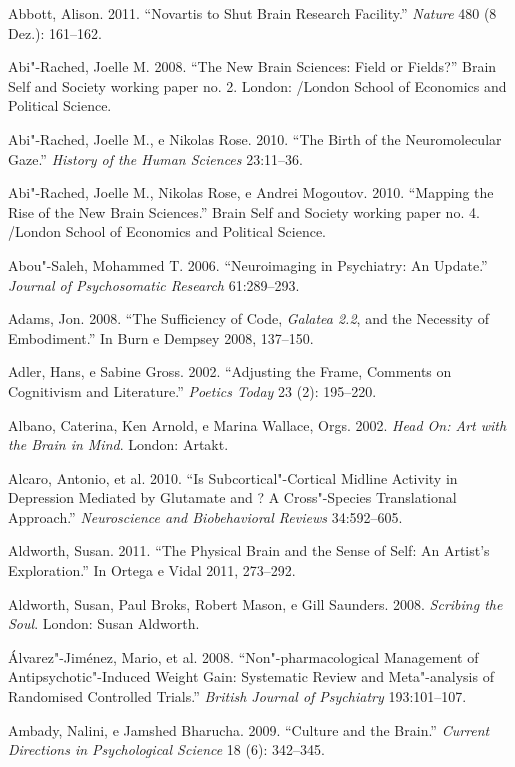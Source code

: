 \footnotesize{\begin{Parskip}
Abbott, Alison. 2011. ``Novartis to Shut Brain Research Facility.''
\emph{Nature} 480 (8 Dez.): 161--162.

Abi"-Rached, Joelle M. 2008. ``The New Brain Sciences: Field or Fields?''
Brain Self and Society working paper no. 2. London: /London School
of Economics and Political Science.

Abi"-Rached, Joelle M., e Nikolas Rose. 2010. ``The Birth of the
Neuromolecular Gaze.'' \emph{History of the Human Sciences} 23:11--36.

Abi"-Rached, Joelle M., Nikolas Rose, e Andrei Mogoutov. 2010. ``Mapping
the Rise of the New Brain Sciences.'' Brain Self and Society working
paper no. 4. /London School of Economics and Political Science.

Abou"-Saleh, Mohammed T. 2006. ``Neuroimaging in Psychiatry: An Update.''
\emph{Journal of Psychosomatic Research} 61:289--293.

Adams, Jon. 2008. ``The Sufficiency of Code, \emph{Galatea 2.2}, and the
Necessity of Embodiment.'' In Burn e Dempsey 2008, 137--150.

Adler, Hans, e Sabine Gross. 2002. ``Adjusting the Frame, Comments on
Cognitivism and Literature.'' \emph{Poetics Today} 23 (2): 195--220.

Albano, Caterina, Ken Arnold, e Marina Wallace, Orgs. 2002. \emph{Head
On: Art with the Brain in Mind}. London: Artakt.

Alcaro, Antonio, et al. 2010. ``Is Subcortical"-Cortical Midline Activity
in Depression Mediated by Glutamate and ? A Cross"-Species
Translational Approach.'' \emph{Neuroscience and Biobehavioral Reviews}
34:592--605.

Aldworth, Susan. 2011. ``The Physical Brain and the Sense of Self: An
Artist's Exploration.'' In Ortega e Vidal 2011, 273--292.

Aldworth, Susan, Paul Broks, Robert Mason, e Gill Saunders. 2008.
\emph{Scribing the Soul}. London: Susan Aldworth.

Álvarez"-Jiménez, Mario, et al. 2008. ``Non"-pharmacological Management of
Antipsychotic"-Induced Weight Gain: Systematic Review and Meta"-analysis
of Randomised Controlled Trials.'' \emph{British Journal of Psychiatry}
193:101--107.

Ambady, Nalini, e Jamshed Bharucha. 2009. ``Culture and the Brain.''
\emph{Current Directions in Psychological Science} 18 (6): 342--345.


\end{Parskip}}
